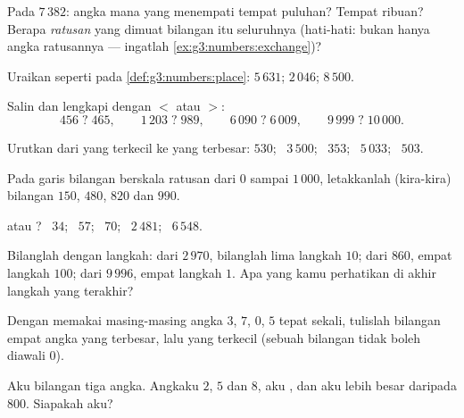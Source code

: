 \begin{exercise}[$\star$]\label{exo:g3:numbers:3}
Pada $7\,382$: angka mana yang menempati tempat puluhan? Tempat
ribuan? Berapa \emph{ratusan} yang dimuat bilangan itu seluruhnya
(hati-hati: bukan hanya angka ratusannya --- ingatlah
\cref{ex:g3:numbers:exchange})?
\end{exercise}

\begin{exercise}[$\star$]\label{exo:g3:numbers:4}
Uraikan seperti pada \cref{def:g3:numbers:place}:
$5\,631$; \quad $2\,046$; \quad $8\,500$.
\end{exercise}

\begin{exercise}[$\star$]\label{exo:g3:numbers:5}
Salin dan lengkapi dengan $<$ atau $>$:
\[
456 \;?\; 465, \qquad
1\,203 \;?\; 989, \qquad
6\,090 \;?\; 6\,009, \qquad
9\,999 \;?\; 10\,000 .
\]
\end{exercise}

\begin{exercise}[$\star$]\label{exo:g3:numbers:6}
Urutkan dari yang terkecil ke yang terbesar: $530$; \ $3\,500$; \ $353$; \ $5\,033$;
\ $503$.
\end{exercise}

\begin{exercise}[$\star$]\label{exo:g3:numbers:7}
Pada garis bilangan berskala ratusan dari $0$ sampai $1\,000$,
letakkanlah (kira-kira) bilangan $150$, $480$, $820$ dan $990$.
\end{exercise}

\begin{exercise}[$\star$]\label{exo:g3:numbers:8}
 atau ? \ $34$; \ $57$; \ $70$; \ $2\,481$; \ $6\,548$.
\end{exercise}

\begin{exercise}[$\star$]\label{exo:g3:numbers:9}
Bilanglah dengan langkah: dari $2\,970$, bilanglah lima langkah
$10$; dari $860$, empat langkah $100$; dari $9\,996$, empat langkah
$1$. Apa yang kamu perhatikan di akhir langkah yang terakhir?
\end{exercise}

\begin{exercise}[$\star\star$]\label{exo:g3:numbers:10}
Dengan memakai masing-masing angka $3$, $7$, $0$, $5$ tepat sekali,
tulislah bilangan empat angka yang terbesar, lalu yang terkecil
(sebuah bilangan tidak boleh diawali $0$).
\end{exercise}

\begin{exercise}[$\star\star$]\label{exo:g3:numbers:11}
Aku bilangan tiga angka. Angkaku $2$, $5$ dan $8$, aku , dan
aku lebih besar daripada $800$. Siapakah aku?

\end{exercise}
